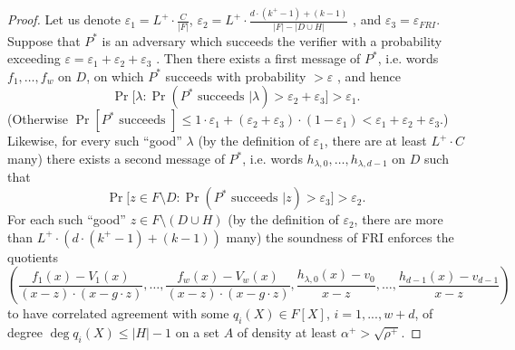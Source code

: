 \documentclass[11pt,article,oneside]{memoir}
\theoremstyle{definition}
\theoremstyle{remark}
\begin{document}
\begin{proof}
Let us denote $\varepsilon_1=L^+ \cdot \frac{C}{|F|}$, $\varepsilon_2 = L^+ \cdot  \frac{d\cdot (k^+ - 1) + (k - 1)}{|F| - |D\cup H|}$ , and $\varepsilon_3=\varepsilon_{FRI}$. 
Suppose that $P^*$ is an adversary which succeeds the verifier with a probability exceeding $\varepsilon =\varepsilon_1+\varepsilon_2+\varepsilon_3$ .
Then there exists a first message of $P^*$, i.e. words  $f_1, \ldots, f_w$  on $D$, on which $P^*$ succeeds with probability $> \varepsilon$ , and hence
\[
\Pr\big[\lambda : \Pr\left(P^*\text{ succeeds } |\lambda\right) > \varepsilon_2+\varepsilon_3 \big] > \varepsilon_1.
\]
(Otherwise $\Pr[P^*\text{ succeeds }] \leq 1\cdot \varepsilon_1+ (\varepsilon_2 + \varepsilon_3)\cdot (1-\varepsilon_1) < \varepsilon_1+ \varepsilon_2 + \varepsilon_3$.) 
Likewise, for every such “good” $\lambda$ (by the definition of $\varepsilon_1$, there are at least $L^+\cdot C$ many) there exists a second message of $P^*$, i.e. words $h_{\lambda, 0}, \ldots, h_{\lambda, d-1}$ on $D$ such that 
\[
\Pr\big[ z\in F\setminus D :  \Pr(P^*\text{ succeeds }| z) >\varepsilon_3 \big] > \varepsilon_2.
\]
For each such “good” $z\in F\setminus (D\cup H)$ (by the definition of $\varepsilon_2$, there are more than $L^+\cdot \left(d\cdot (k^+ - 1) + (k - 1)\right)$ many) the soundness of FRI enforces the quotients
\[ 
\left( 
\frac{f_1(x)-V_1(x)}{(x-z)\cdot (x-g\cdot z)}, \ldots, \frac{f_w(x)-V_w(x)}{(x-z)\cdot (x-g\cdot z)}, \frac{h_{\lambda,0}(x)- v_0}{x-z}, \ldots , \frac{h_{d - 1}(x) -v_{d-1}}{x-z}
\right)
\]
to have correlated agreement with some $q_i(X)\in F[X]$, $i=1,...,w +d$, of degree $\deg q_i(X) \leq |H|-1$ on a set $A$ of density at least 
$
\alpha^+ %
> \sqrt{\rho^+}.
$ 



\end{proof}
\end{document}
